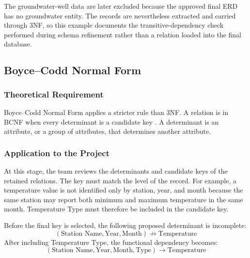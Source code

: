 The groundwater-well data are later excluded because the approved final ERD
has no groundwater entity. The records are nevertheless extracted and carried
through 3NF, so this example documents the transitive-dependency check performed
during schema refinement rather than a relation loaded into the final database.
\subsection{Boyce--Codd Normal Form}
\label{subsec:bcnf}

\subsubsection{Theoretical Requirement}

Boyce--Codd Normal Form applies a stricter rule than 3NF. A relation is in BCNF
when every determinant is a candidate key \cite{codd1972further}. A determinant
is an attribute, or a group of attributes, that determines another attribute.

\subsubsection{Application to the Project}

At this stage, the team reviews the determinants and candidate keys of the
retained relations. The key must match the level of the record. For example, a
temperature value is not identified only by station, year, and month because
the same station may report both minimum and maximum temperature in the same
month. Temperature Type must therefore be included in the candidate key.

Before the final key is selected, the following proposed determinant is
incomplete:
\[
(\text{Station Name},\text{Year},\text{Month})
\nrightarrow \text{Temperature}
\]
After including Temperature Type, the functional dependency becomes:
\[
(\text{Station Name},\text{Year},\text{Month},\text{Type})
\rightarrow \text{Temperature}
\]

